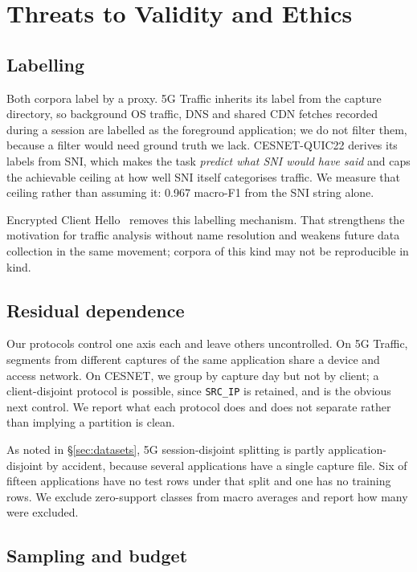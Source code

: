\section{Threats to Validity and Ethics}
\label{sec:threats}

\subsection{Labelling}

Both corpora label by a proxy. 5G Traffic inherits its label from the capture
directory, so background OS traffic, DNS and shared CDN fetches recorded during
a session are labelled as the foreground application; we do not filter them,
because a filter would need ground truth we lack. CESNET-QUIC22 derives its
labels from SNI, which makes the task \emph{predict what SNI would have said}
and caps the achievable ceiling at how well SNI itself categorises traffic. We
measure that ceiling rather than assuming it: 0.967 macro-F1 from the SNI
string alone.

Encrypted Client Hello~\cite{rescorla2024ech} removes this labelling mechanism.
That strengthens the motivation for traffic analysis without name resolution
and weakens future data collection in the same movement; corpora of this kind
may not be reproducible in kind.

\subsection{Residual dependence}

Our protocols control one axis each and leave others uncontrolled. On 5G
Traffic, segments from different captures of the same application share a
device and access network. On CESNET, we group by capture day but not by
client; a client-disjoint protocol is possible, since \texttt{SRC\_IP} is
retained, and is the obvious next control. We report what each protocol does
and does not separate rather than implying a partition is clean.

As noted in \S\ref{sec:datasets}, 5G session-disjoint splitting is partly
application-disjoint by accident, because several applications have a single
capture file. Six of fifteen applications have no test rows under that split
and one has no training rows. We exclude zero-support classes from macro
averages and report how many were excluded.

\subsection{Sampling and budget}

